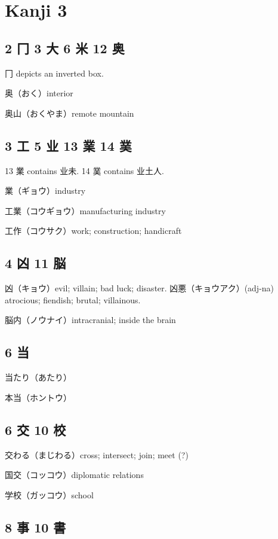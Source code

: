 \chapter{Kanji 3}

\section{2 冂 3 大 6 米 12 奥}

冂 depicts an inverted box.

奥（おく）interior

奥山（おくやま）remote mountain

\section{3 工 5 业 13 業 14 菐}

13 業 contains 业未.
14 菐 contains 业土人.

業（ギョウ）industry

工業（コウギョウ）manufacturing industry

工作（コウサク）work; construction; handicraft

\section{4 凶 11 脳}

凶（キョウ）evil; villain; bad luck; disaster.
凶悪（キョウアク）(adj-na) atrocious; fiendish; brutal; villainous.

脳内（ノウナイ）intracranial; inside the brain

\section{6 当}

当たり（あたり）

本当（ホントウ）

\section{6 交 10 校}

交わる（まじわる）cross; intersect; join; meet (?)

国交（コッコウ）diplomatic relations

学校（ガッコウ）school

\section{8 事 10 書}

